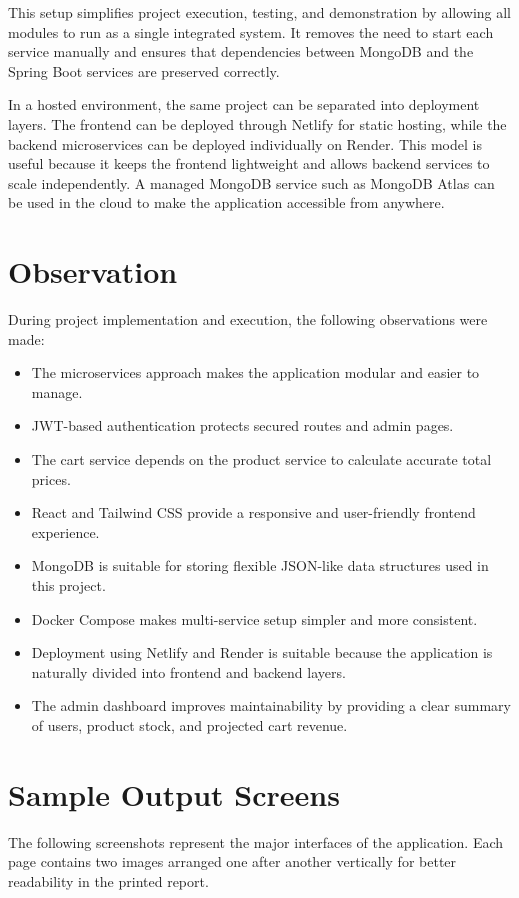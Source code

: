 \documentclass[12pt,a4paper]{article}
\begin{document}
This setup simplifies project execution, testing, and demonstration by allowing all modules to run as a single integrated system. It removes the need to start each service manually and ensures that dependencies between MongoDB and the Spring Boot services are preserved correctly.

In a hosted environment, the same project can be separated into deployment layers. The frontend can be deployed through Netlify for static hosting, while the backend microservices can be deployed individually on Render. This model is useful because it keeps the frontend lightweight and allows backend services to scale independently. A managed MongoDB service such as MongoDB Atlas can be used in the cloud to make the application accessible from anywhere.

\section{Observation}
During project implementation and execution, the following observations were made:
\begin{itemize}[leftmargin=1.5cm]
    \item The microservices approach makes the application modular and easier to manage.
    \item JWT-based authentication protects secured routes and admin pages.
    \item The cart service depends on the product service to calculate accurate total prices.
    \item React and Tailwind CSS provide a responsive and user-friendly frontend experience.
    \item MongoDB is suitable for storing flexible JSON-like data structures used in this project.
    \item Docker Compose makes multi-service setup simpler and more consistent.
    \item Deployment using Netlify and Render is suitable because the application is naturally divided into frontend and backend layers.
    \item The admin dashboard improves maintainability by providing a clear summary of users, product stock, and projected cart revenue.
\end{itemize}

\section{Sample Output Screens}
The following screenshots represent the major interfaces of the application. Each page contains two images arranged one after another vertically for better readability in the printed report.
\end{document}

